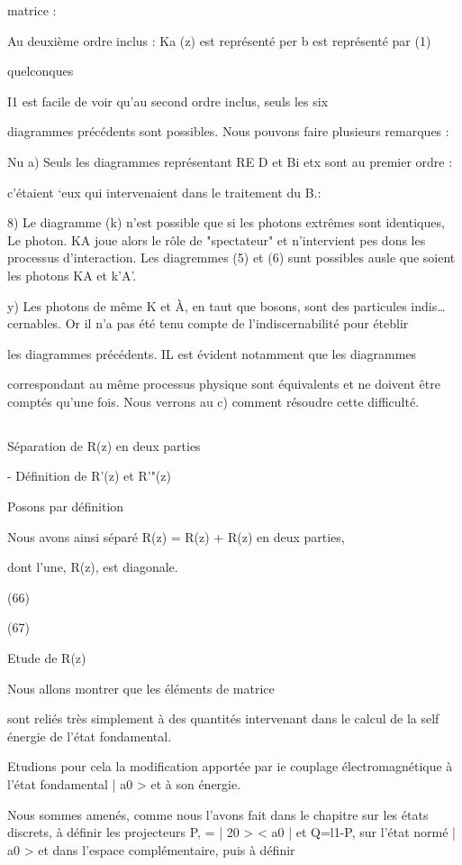 matrice : 

Au deuxième ordre inclus : Ka
(z) est représenté per
b est représenté par (1)

quelconques

I1 est facile de voir qu'au second ordre inclus, seuls les six

diagrammes précédents sont possibles. Nous pouvons faire plusieurs remarques :

Nu
a) Seuls les diagrammes représentant RE D et Bi etx sont au premier ordre :

c'étaient ‘eux qui intervenaient dans le traitement du  B.:

8) Le diagramme (k) n'est possible que si les photons extrêmes sont identiques,
Le photon. KA joue alors le rôle de "spectateur" et n'intervient pes dons les
processus d'interaction. Les diagremmes (5) et (6) sunt possibles ausle que
soient les photons KA et k'A'.

y) Les photons de même K et À, en taut que bosons, sont des particules indis…
cernables. Or il n'a pas été tenu compte de l'indiscernabilité pour éteblir

les diagrammes précédents. IL est évident notamment que les diagrammes

correspondant au même processus physique sont équivalents et ne doivent être
comptés qu'une fois. Nous verrons au c) comment résoudre cette difficulté.
\subsection{} Séparation de R(z) en deux parties%

- Définition de R'(z) et R'"(z)

Posons par définition

Nous avons ainsi séparé R(z) = R(z) + R(z) en deux parties,

dont l'une, R(z), est diagonale.

(66)

(67)

Etude de R(z)

Nous allons montrer que les éléments de matrice

sont reliés très simplement à des quantités intervenant dans le calcul de la
self énergie de l'état fondamental.

Etudions pour cela la modification apportée par ie couplage
électromagnétique à l'état fondamental | a0 > et à son énergie.

Nous sommes amenés, comme nous l'avons fait dans le chapitre sur
les états discrets, à définir les projecteurs P, = | 20 > < a0 | et Q=l1-P,
sur l'état normé | a0 > et dans l'espace complémentaire, puis à définir

